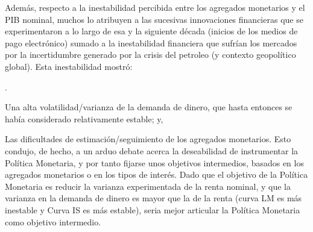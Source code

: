 \documentclass[10pt,a4paper]{article}
\newcounter{numitem}
\newenvironment{lnum}
      {\begin{list}{\arabic{numitem}.}{%
          \usecounter{numitem}%
          \setlength{\leftmargin}{1cm}%
          \setlength{\parskip}{3pt}%
          \setlength{\itemsep}{0pt}%
          \setlength{\parsep}{0pt}%
      }}
      {\end{list}}
\begin{document}
Además, respecto a la inestabilidad percibida entre los agregados monetarios y el PIB nominal, muchos lo atribuyen a las sucesivas innovaciones financieras que se experimentaron a lo largo de esa y la siguiente década (inicios de los medios de pago electrónico) sumado a la inestabilidad financiera que sufrían los mercados por la incertidumbre generado por la crisis del petroleo (y contexto geopolítico global). Esta inestabilidad mostró:
\begin{lnum}
    \item Una alta volatilidad/varianza de la demanda de dinero, que hasta entonces se había considerado relativamente estable; y,
    \item Las dificultades de estimación/seguimiento de los agregados monetarios. Esto condujo, de hecho, a un arduo debate acerca la deseabilidad de instrumentar la Política Monetaria, y por tanto fijarse unos objetivos intermedios, basados en los agregados monetarios o en los tipos de interés. Dado que el objetivo de la Política Monetaria es reducir la varianza experimentada de la renta nominal, y que la varianza en la demanda de dinero es mayor que la de la renta (curva LM es más inestable y Curva IS es más estable), seria mejor articular la Política Monetaria como objetivo intermedio.
\end{lnum}
\end{document}
